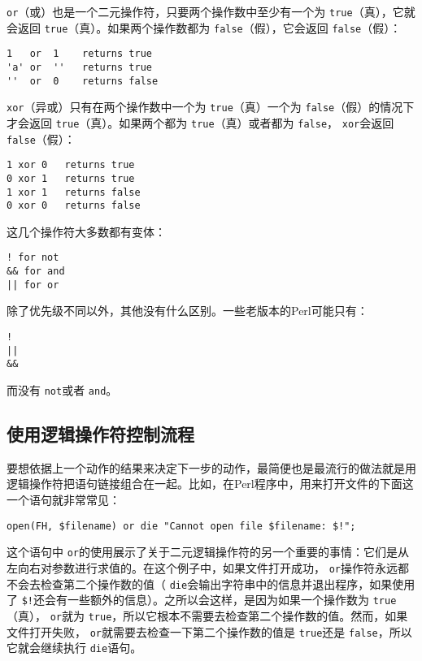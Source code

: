 \verb|or|（或）也是一个二元操作符，只要两个操作数中至少有一个为 \verb|true|（真），它就会返回 \verb|true|（真）。如果两个操作数都为 \verb|false|（假），它会返回 \verb|false|（假）：

\begin{lstlisting}
1   or  1    returns true
'a' or  ''   returns true
''  or  0    returns false
\end{lstlisting}

 \verb|xor|（异或）只有在两个操作数中一个为 \verb|true|（真）一个为 \verb|false|（假）的情况下才会返回 \verb|true|（真）。如果两个都为 \verb|true|（真）或者都为 \verb|false|， \verb|xor|会返回 \verb|false|（假）：

\begin{lstlisting}
1 xor 0   returns true
0 xor 1   returns true
1 xor 1   returns false
0 xor 0   returns false
\end{lstlisting}

这几个操作符大多数都有变体：

\begin{lstlisting}
! for not
&& for and
|| for or
\end{lstlisting}

除了优先级不同以外，其他没有什么区别。一些老版本的Perl可能只有：

\begin{lstlisting}
!
||
&&
\end{lstlisting}

而没有 \verb|not|或者 \verb|and|。

\subsection{使用逻辑操作符控制流程}
要想依据上一个动作的结果来决定下一步的动作，最简便也是最流行的做法就是用逻辑操作符把语句链接组合在一起。比如，在Perl程序中，用来打开文件的下面这一个语句就非常常见：

\begin{lstlisting}
open(FH, $filename) or die "Cannot open file $filename: $!";
\end{lstlisting}

这个语句中 \verb|or|的使用展示了关于二元逻辑操作符的另一个重要的事情：它们是从左向右对参数进行求值的。在这个例子中，如果文件打开成功， \verb|or|操作符永远都不会去检查第二个操作数的值（ \verb|die|会输出字符串中的信息并退出程序，如果使用了 \verb|$!|还会有一些额外的信息）。之所以会这样，是因为如果一个操作数为 \verb|true|（真）， \verb|or|就为 \verb|true|，所以它根本不需要去检查第二个操作数的值。然而，如果文件打开失败， \verb|or|就需要去检查一下第二个操作数的值是 \verb|true|还是 \verb|false|，所以它就会继续执行 \verb|die|语句。

